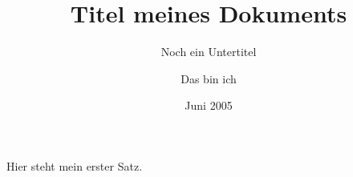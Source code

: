 \documentclass[a4paper,DIV=calc,11pt]{scrartcl}
\begin{document}
	
\onehalfspace %
	
\title{Titel meines Dokuments}
\subtitle{Noch ein Untertitel}
\author{Das bin ich}
\date{\small Juni 2005}
\maketitle %

Hier steht mein erster Satz.
\end{document}

